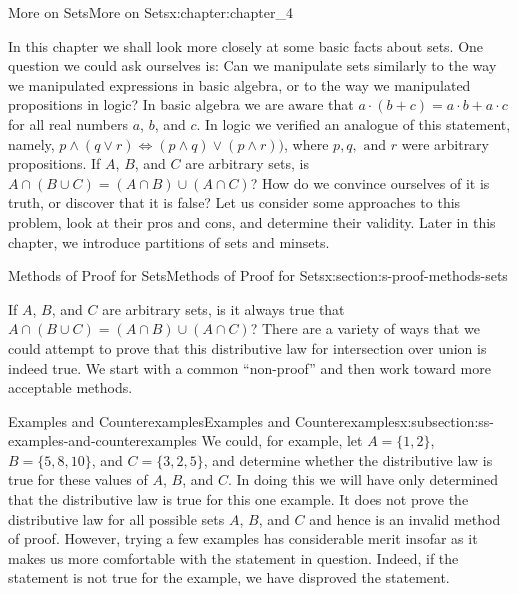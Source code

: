 \documentclass[oneside,10pt,]{book}
\begin{document}
\begin{chapterptx}{More on Sets}{}{More on Sets}{}{}{x:chapter:chapter_4}
\begin{introduction}{}%
In this chapter we shall look more closely at some basic facts about sets. One question we could ask ourselves is: Can we manipulate sets similarly to the way we manipulated expressions in basic algebra, or to the way we manipulated propositions in logic? In basic algebra we are aware that \(a \cdot  (b + c) = a\cdot  b + a \cdot  c\) for all real numbers \(a\), \(b\), and \(c\). In logic we verified an analogue of this statement, namely, \(p
\land  ( q \lor  r) \Leftrightarrow  (p \land  q)\lor  (p \land  r))\), where \(p, q, \textrm{ and } r\) were arbitrary propositions. If \(A\), \(B\), and \(C\) are arbitrary sets, is \(A \cap  (B \cup  C) = (A \cap  B) \cup  (A \cap  C)\)? How do we convince ourselves of it is truth, or discover that it is false? Let us consider some approaches to this problem, look at their pros and cons, and determine their validity.  Later in this chapter, we introduce partitions of sets and minsets.%
\end{introduction}%
%
%
\typeout{************************************************}
\typeout{************************************************}
%
\begin{sectionptx}{Methods of Proof for Sets}{}{Methods of Proof for Sets}{}{}{x:section:s-proof-methods-sets}
\begin{introduction}{}%
If \(A\), \(B\), and \(C\) are arbitrary sets, is it always true that \(A \cap  (B \cup  C) = (A \cap  B) \cup  (A \cap  C)\)?  There are a variety of ways that we could attempt to prove that this distributive law for intersection over union is indeed true.  We start with a common ``non-proof'' and then work toward more acceptable methods.%
\end{introduction}%
%
%
\typeout{************************************************}
\typeout{************************************************}
%
\begin{subsectionptx}{Examples and Counterexamples}{}{Examples and Counterexamples}{}{}{x:subsection:ss-examples-and-counterexamples}
We could, for example, let \(A = \{1, 2\}\), \(B = \{5, 8, 10\}\), and \(C = \{3, 2, 5\}\), and determine whether the distributive law is true for these values of \(A\), \(B\), and \(C\). In doing this we will have only determined that the distributive law is true for this one example. It does not prove the distributive law for all possible sets \(A\), \(B\), and \(C\) and hence is an invalid method of proof. However, trying a few examples has considerable merit insofar as it makes us more comfortable with the statement in question. Indeed, if the statement is not true for the example, we have disproved the statement.%

\end{subsectionptx}
\end{sectionptx}
\end{chapterptx}
\end{document}
